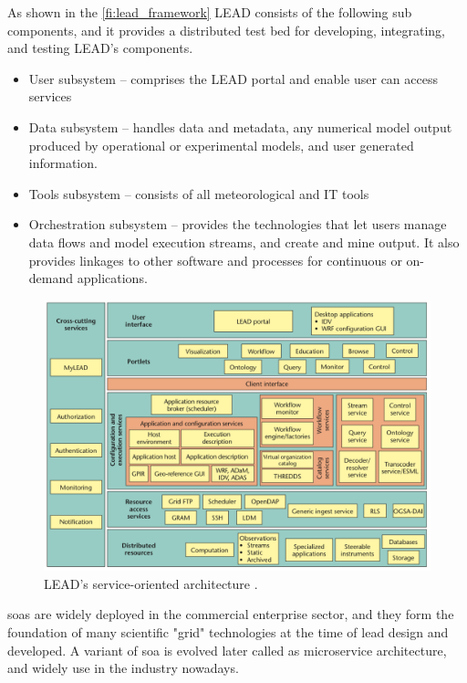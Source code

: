 As shown in the \cref{fi:lead_framework} LEAD consists of the following sub components, and it provides a distributed test bed for developing, integrating, and testing LEAD's components.
\begin{itemize}
    \item User subsystem -- comprises the LEAD portal and enable user can access services
    \item Data subsystem -- handles data and metadata, any numerical model output produced by operational or experimental models, and user generated information.
    \item Tools subsystem -- consists of all meteorological and IT tools
    \item Orchestration subsystem -- provides the technologies that let users manage data flows and model execution streams, and create and mine output. It also provides linkages to other software and processes for continuous or on-demand applications. 
\end{itemize}

\begin{figure}[htp]
    \centering
    \includegraphics[width=1\textwidth]{lit/lead/LEADs-service-oriented-architecture-A-wide-variety-of-services-and-resources-grouped_W640.png}
    \caption[LEAD's service-oriented architecture]{LEAD's service-oriented architecture \cite{Droegemeier2005Service-OrientedWeather}.}
    \label{fi:lead_soa}
\end{figure}

\acrshort{soa}s are widely deployed in the commercial enterprise sector, and they form the foundation of many scientific "grid" technologies at the time of \acrshort{lead} design and developed. A variant of \acrshort{soa} is evolved later called as microservice architecture, and widely use in the industry nowadays.

